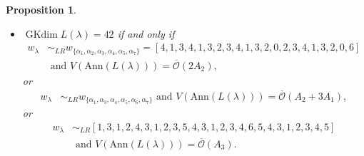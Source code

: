 \documentclass[reqno,12pt]{amsart}
\numberwithin{equation}{section}
\theoremstyle{plain}
\newtheorem{Prop}[Thm]{Proposition}
\theoremstyle{definition}
\newcommand{\lam}{\lambda}
\newcommand{\Ann}{\mathrm{Ann}}
\newcommand{\gkd}{\operatorname{GKdim}}
\begin{document}
\begin{Prop}
\begin{itemize}
\item[(10)] $\gkd L(\lambda)=42$ if and only if
\begin{align*}w_{\lambda}&\sim_{LR}w_{\{\alpha_1,\alpha_2,\alpha_3,\alpha_4,\alpha_5,\alpha_7\}}=[4,1,3,4,1,3,2,3,4,1,3,2,0,2,3,4,1,3,2,0,6]\\
&\text{~and~} V(\Ann (L(\lam)))=\overline{\mathcal{O}}(2A_2),  \end{align*}
        or
        \begin{align*}
w_{\lambda}&\sim_{LR}w_{\{\alpha_1,\alpha_3,\alpha_4,\alpha_5,\alpha_6,\alpha_7\}} \text{~and~} V(\Ann (L(\lam)))=\overline{\mathcal{O}}(A_2+3A_1),
        \end{align*}
or 
\begin{align*}
w_{\lambda}&\sim_{LR} [1, 3, 1, 2, 4, 3, 1, 2, 3, 5, 4, 3, 1, 2, 3, 4, 6, 5, 4, 3, 1, 2, 3, 4, 5]\\
& \text{~and~} V(\Ann (L(\lam)))=\overline{\mathcal{O}}(A_3).
\end{align*}
       

\end{itemize}
\end{Prop}
\end{document}
